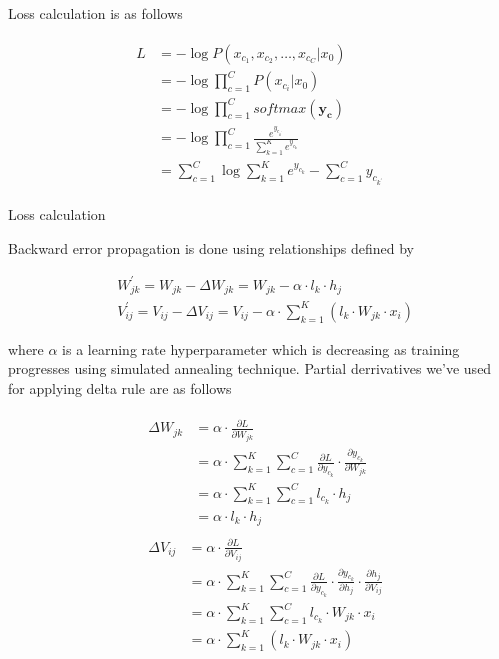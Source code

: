 \documentclass{article}
\newcommand{\SetAlgoStyle}{
	\SetAlgoNoLine
	\SetAlgoNoEnd
	\DontPrintSemicolon
}
\begin{document}
Loss calculation is as follows

\begin{align}
	\begin{aligned}
		L &= -\log P(x_{c_1}, x_{c_2},\ldots,x_{c_C}|x_0) \\
		&= -\log \prod_{c=1}^C P(x_{c_i}|x_0) \\
		&= -\log \prod_{c=1}^C softmax(\boldsymbol{y_c}) \\
		&= -\log \prod_{c=1}^C \frac{e^{y_{c_{k^\prime}}}}{\sum_{k=1}^K
		e^{y_{c_k}}} \\
		&= \sum_{c=1}^C \log\sum_{k=1}^K e^{y_{c_k}} - \sum_{c=1}^C
		y_{c_{k^\prime}}
	\end{aligned}
\end{align}

\begin{algorithm}[H]
	\caption{Loss calculation}
	\SetAlgoStyle
\end{algorithm}

Backward error propagation is done using relationships defined by

\begin{align}
	&W_{jk}^\prime = W_{jk} - \Delta W_{jk} =
	W_{jk} - \alpha \cdot l_k \cdot h_j \\
	&V_{ij}^\prime = V_{ij} - \Delta V_{ij} =
	V_{ij} - \alpha \cdot \sum_{k=1}^K (l_k \cdot W_{jk} \cdot x_i)
\end{align}

where $\alpha$ is a learning rate hyperparameter which is decreasing as
training progresses using simulated annealing technique.
Partial derrivatives we've used for applying delta rule are as follows

\begin{align}
	&\begin{aligned}
		\Delta W_{jk} &= \alpha \cdot \frac{\partial L}{\partial W_{jk}} \\
		&= \alpha \cdot \sum_{k=1}^K \sum_{c=1}^C \frac{\partial L}{\partial y_{c_k}}
		\cdot \frac{\partial y_{c_k}}{\partial W_{jk}} \\
		&= \alpha \cdot \sum_{k=1}^K \sum_{c=1}^C l_{c_k} \cdot h_j \\
		&= \alpha \cdot l_k \cdot h_j
	\end{aligned} \\
	&\begin{aligned}
		\Delta V_{ij} &= \alpha \cdot \frac{\partial L}{\partial V_{ij}} \\
		&= \alpha \cdot \sum_{k=1}^K \sum_{c=1}^C \frac{\partial L}{\partial y_{c_k}}
		\cdot \frac{\partial y_{c_k}}{\partial h_j} \cdot
		\frac{\partial h_j}{\partial V_{ij}} \\
		&= \alpha \cdot \sum_{k=1}^K \sum_{c=1}^C l_{c_k} \cdot W_{jk} \cdot x_i \\
		&= \alpha \cdot \sum_{k=1}^K (l_k \cdot W_{jk} \cdot x_i)
	\end{aligned}
\end{align}
\end{document}

